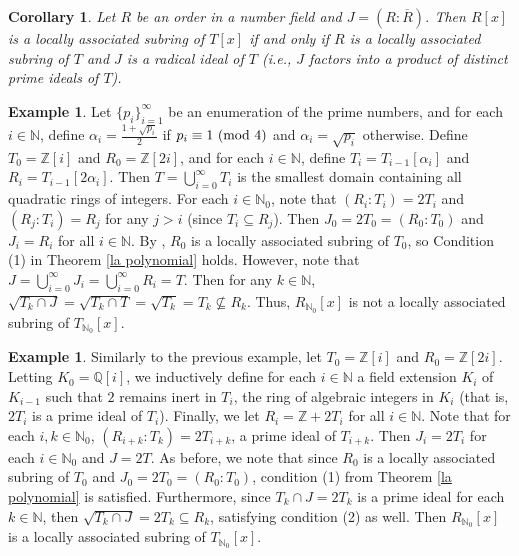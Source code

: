 \documentclass[12pt]{amsart}
\newtheorem{corollary}[theorem]{Corollary}
\theoremstyle{definition}
\newtheorem{example}[theorem]{Example}
\newcommand{\bZ}{\mathbb Z}
\newcommand{\bQ}{\mathbb Q}
\newcommand{\bN}{\mathbb N}
\newcommand{\bNo}{{{\mathbb N}_0}}
\newcommand{\Rbar}{{\overline{R}}}
\newcommand{\modulo}[1]{\textup{ (mod }#1)}
\begin{document}
\begin{corollary}
    Let $R$ be an order in a number field and $J=(R:\Rbar)$. Then $R[x]$ is a locally associated subring of $T[x]$ if and only if $R$ is a locally associated subring of $T$ and $J$ is a radical ideal of $T$ (i.e., $J$ factors into a product of distinct prime ideals of $T$).
\end{corollary}

\begin{example}
\label{polynomial not la}
    Let $\{p_i\}_{i=1}^\infty$ be an enumeration of the prime numbers, and for each $i\in\bN$, define $\alpha_i=\frac{1+\sqrt{p_i}}{2}$ if $p_i\equiv 1\modulo{4}$ and $\alpha_i=\sqrt{p_i}$ otherwise. Define $T_0=\bZ[i]$ and $R_0=\bZ[2i]$, and for each $i\in\bN$, define $T_i=T_{i-1}[\alpha_i]$ and $R_i=T_{i-1}[2\alpha_i]$. Then $T=\bigcup_{i=0}^\infty T_i$ is the smallest domain containing all quadratic rings of integers. For each $i\in\bN_0$, note that $(R_i:T_i)=2T_i$ and $(R_j:T_i)=R_j$ for any $j>i$ (since $T_i\subseteq R_j$). Then $J_0=2T_0=(R_0:T_0)$ and $J_i=R_i$ for all $i\in\bN$. By \cite[Theorem 6.4]{subringrelations}, $R_0$ is a locally associated subring of $T_0$, so Condition (1) in Theorem \ref{la polynomial} holds. However, note that $J=\bigcup_{i=0}^\infty J_i=\bigcup_{i=0}^\infty R_i=T$. Then for any $k\in\bN$, $\sqrt{T_k\cap J}=\sqrt{T_k\cap T}=\sqrt{T_k}=T_k\nsubseteq R_k$. Thus, $R_\bNo[x]$ is not a locally associated subring of $T_\bNo[x]$.
\end{example}

\begin{example}
\label{polynomial la}
    Similarly to the previous example, let $T_0=\bZ[i]$ and $R_0=\bZ[2i]$. Letting $K_0=\bQ[i]$, we inductively define for each $i\in\bN$ a field extension $K_i$ of $K_{i-1}$ such that $2$ remains inert in $T_i$, the ring of algebraic integers in $K_i$ (that is, $2T_i$ is a prime ideal of $T_i$). Finally, we let $R_i=\bZ+2T_i$ for all $i\in\bN$. Note that for each $i,k\in\bN_0$, $(R_{i+k}:T_k)=2T_{i+k}$, a prime ideal of $T_{i+k}$. Then $J_i=2T_i$ for each $i\in\bN_0$ and $J=2T$. As before, we note that since $R_0$ is a locally associated subring of $T_0$ and $J_0=2T_0=(R_0:T_0)$, condition (1) from Theorem \ref{la polynomial} is satisfied. Furthermore, since $T_k\cap J=2T_k$ is a prime ideal for each $k\in\bN$, then $\sqrt{T_k\cap J}=2T_k\subseteq R_k$, satisfying condition (2) as well. Then $R_\bNo[x]$ is a locally associated subring of $T_\bNo[x]$.
\end{example}
\end{document}
